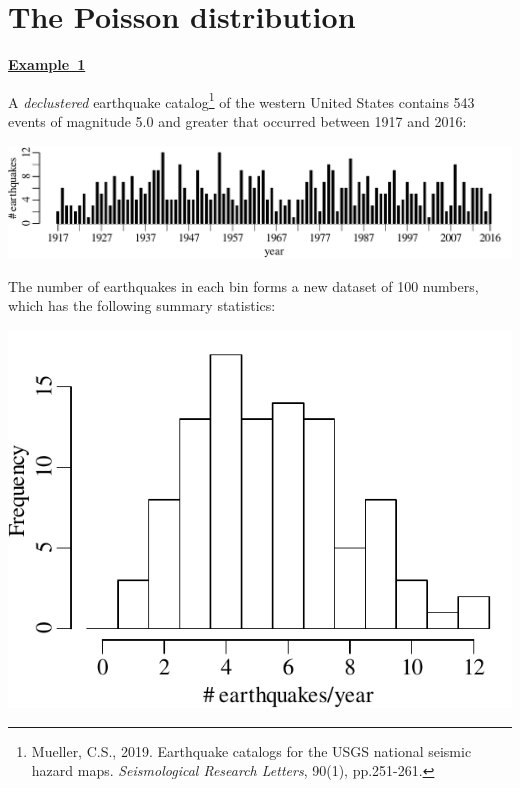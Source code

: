 \chapter{The Poisson distribution}
\label{ch:poisson}

\textbf{\underline{Example~1}}\medskip

A \emph{declustered} earthquake catalog\footnote{Mueller, C.S.,
  2019. Earthquake catalogs for the USGS national seismic hazard
  maps. \textit{Seismological Research Letters}, 90(1), pp.251-261.}
of the western United States contains 543 events of magnitude 5.0 and
greater that occurred between 1917 and 2016:\medskip

\noindent\includegraphics[width=\textwidth]{../figures/declusteredquakes.pdf}
\begingroup {}
\label{fig:declusteredquakes}
\endgroup

The number of earthquakes in each bin forms a new dataset of 100
numbers, which has the following summary statistics:

\noindent\begin{minipage}[t][][b]{.35\textwidth}
  \includegraphics[width=\textwidth]{../figures/declusteredquakesperyear.pdf}\medskip
\end{minipage}
\begin{minipage}[t][][t]{.65\textwidth}
  \label{fig:declusteredquakesperyear}
\end{minipage}

